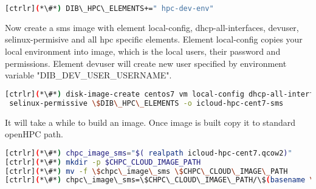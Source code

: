 \begin{lstlisting}[language=bash,keywords={}]
[ctrlr](*\#*) DIB\_HPC\_ELEMENTS+=" hpc-dev-env"
\end{lstlisting}

Now create a sms image with element local-config, dhcp-all-interfaces, devuser, selinux-permisive and all hpc specific elements. Element local-config copies your local environment into image, which is the local users, their password and permissions. Element devuser will create new user specified by environment variable "DIB\_DEV\_USER\_USERNAME". 

\begin{lstlisting}[language=bash,keywords={}]
[ctrlr](*\#*) disk-image-create centos7 vm local-config dhcp-all-interfaces devuser \
 selinux-permissive \$DIB\_HPC\_ELEMENTS -o icloud-hpc-cent7-sms
\end{lstlisting}

It will take a while to build an image. Once image is built copy it to standard openHPC path.

\begin{lstlisting}[language=bash,keywords={}]
[ctrlr](*\#*) chpc_image_sms="$( realpath icloud-hpc-cent7.qcow2)"
[ctrlr](*\#*) mkdir -p $CHPC_CLOUD_IMAGE_PATH
[ctrlr](*\#*) mv -f \$chpc\_image\_sms \$CHPC\_CLOUD\_IMAGE\_PATH
[ctrlr](*\#*) chpc\_image\_sms=\$CHPC\_CLOUD\_IMAGE\_PATH/\$(basename \$chpc\_image\_sms)
\end{lstlisting}